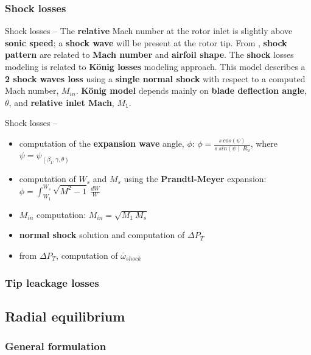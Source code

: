 \subsubsection{Shock losses}
	\begin{frame}{Shock losses -- }
		The \textbf{relative} Mach number at the rotor inlet is slightly above \textbf{sonic speed}; a \textbf{shock wave} will be present at the rotor tip. From \cite{manfredi2020transonic}, \textbf{shock pattern} are related to \textbf{Mach number} and \textbf{airfoil shape}.
		\newline
		\newline 
		The \textbf{shock} losses modeling is related to \textbf{K\"onig losses} modeling approach. This model describes a \textbf{2 shock waves loss} using a \textbf{single normal shock} with respect to a computed Mach number, $M_{in}$. 
		\newline
		\newline
		\textbf{K\"onig model} depends mainly on \textbf{blade deflection angle}, $\theta$, and \textbf{relative inlet Mach}, $M_1$.
	\end{frame}
	\begin{frame}{Shock losses -- }
		\begin{itemize}
			\item computation of the \textbf{expansion wave} angle, $\phi$: $\phi = \frac{s \ cos(\psi)}{s \ sin(\psi) \ R_u}$, where $\psi = \psi_{(\beta_1, \gamma, \theta)}$
			\item computation of $W_s$ and $M_s$ using the \textbf{Prandtl-Meyer} expansion: $\phi = \int_{W_1}^{W_s} \sqrt{M^2 - 1} \ \frac{dW}{W}$
			\item $M_{in}$ computation: $M_{in} = \sqrt{M_1 \ M_s}$
			\item \textbf{normal shock} solution and computation of $\Delta P_{T}$
			\item from $\Delta P_T$, computation of $\bar{\omega}_{shock}$
		\end{itemize}
	\end{frame}
\subsubsection{Tip leackage losses}
\subsection{Radial equilibrium}
\subsubsection{General formulation}
